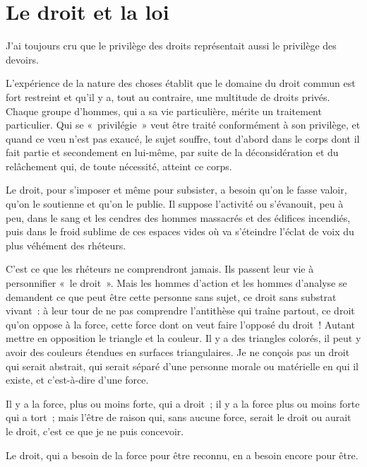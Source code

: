 \documentclass[french,twoside]{book} %
\newcommand{\astermono}{\medskip\centerline{\color{rubric}\large\selectfont{\syms ✻}}\medskip\par}%
\begin{document}
\section[Le droit et la loi]{Le droit et la loi}
\noindent J’ai toujours cru que le privilège des droits représentait aussi le privilège des devoirs.\par

\astermono

\noindent L’expérience de la nature des choses établit que le domaine du droit commun est fort restreint et qu’il y a, tout au contraire, une multitude de droits privés. Chaque groupe d’hommes, qui a sa vie particulière, mérite un traitement particulier. Qui se « privilégie » veut être traité conformément à son privilège, et quand ce vœu n’est pas exaucé, le sujet souffre, tout d’abord dans le corps dont il fait partie et secondement en lui-même, par suite de la déconsidération et du relâchement qui, de toute nécessité, atteint ce corps.\par

\astermono

\noindent Le droit, pour s’imposer et même pour subsister, a besoin qu’on le fasse valoir, qu’on le soutienne et qu’on le publie. Il suppose l’activité ou s’évanouit, peu à peu, dans le sang et les cendres des hommes massacrés et des édifices incendiés, puis dans le froid sublime de ces espaces vides où va s’éteindre l’éclat de voix du plus véhément des rhéteurs.\par
C’est ce que les rhéteurs ne comprendront jamais. Ils passent leur vie à personnifier « le droit ». Mais les hommes d’action et les hommes d’analyse se demandent ce que peut être cette personne sans sujet, ce droit sans substrat vivant : à leur tour de ne pas comprendre l’antithèse qui traîne partout, ce droit qu’on oppose à la force, cette force dont on veut faire l’opposé du droit ! Autant mettre en opposition le triangle et la couleur. Il y a des triangles colorés, il peut y avoir des couleurs étendues en surfaces triangulaires. Je ne conçois pas un droit qui serait abstrait, qui serait séparé d’une personne morale ou matérielle en qui il existe, et c’est-à-dire d’une force.\par
Il y a la force, plus ou moins forte, qui a droit ; il y a la force plus ou moins forte qui a tort ; mais l’être de raison qui, sans aucune force, serait le droit ou aurait le droit, c’est ce que je ne puis concevoir.\par
Le droit, qui a besoin de la force pour être reconnu, en a besoin encore pour être.\par
\end{document}
